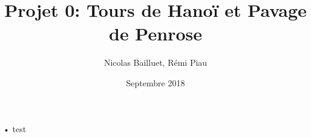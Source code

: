 \documentclass[usenames,dvipsnames,14pt]{beamer}%
\author{Nicolas Bailluet, Rémi Piau}
\title{Projet 0: Tours de Hanoï et Pavage de Penrose}
\institute{L3, ENS Rennes}
\date{Septembre 2018}
\begin{document}
\beamertemplatenavigationsymbolsempty

\begin{frame}
\titlepage
\end{frame}

\begin{frame}
\tableofcontents
\end{frame}

\begin{frame}{•}
test
\end{frame}
\end{document}
